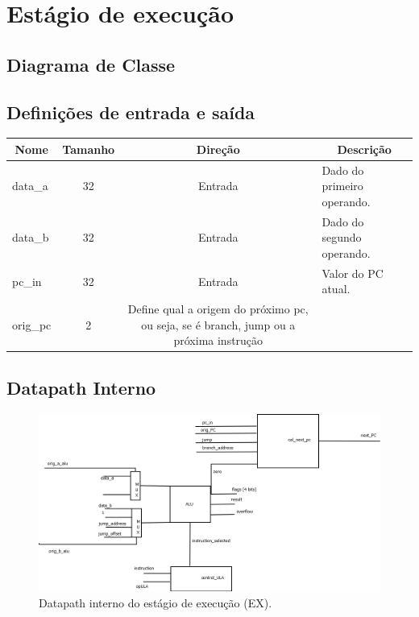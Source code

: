 \section{Estágio de execução}
	\subsection{Diagrama de Classe}
  \begin{figure}[h]
    
  \end{figure}
		
		\subsection{Definições de entrada e saída}
		
	\begin{center}
		\begin{longtable}[pos]{| l | c | c | m{7cm} |} \hline
			\multicolumn{1}{|c|}{\cellcolor[gray]{0.9}\textbf{Nome}} & 
			\multicolumn{1}{c|}{\cellcolor[gray]{0.9}\textbf{Tamanho}} & 
			\multicolumn{1}{c|}{\cellcolor[gray]{0.9}\textbf{Direção}} &
			\multicolumn{1}{c|}{\cellcolor[gray]{0.9}\textbf{Descrição}} \\ \hline
			\endhead
			\hline
			\endlastfoot
			
			data\_a & 32 & Entrada & Dado do primeiro operando. \\ \hline
			data\_b & 32 & Entrada & Dado do segundo operando. \\ \hline
			pc\_in & 32 & Entrada & Valor do PC atual. \\ \hline
			orig\_pc & 2 & Define qual a origem do próximo pc, ou seja, se é branch, jump ou a próxima instrução \\ \hline
			
			
			
			
		\end{longtable}
	\end{center}
	
	\subsection{Datapath Interno}
	
	\begin{figure}[ht]
		\begin{center}
		\includegraphics[scale = 0.5]{./datapath/step3.png}
		\caption*{Datapath interno do estágio de execução (EX).}
		\end{center}
	\end{figure}
